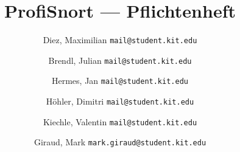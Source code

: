 \documentclass[a4paper]{scrreprt}
\begin{document}
\title{ProfiSnort --- Pflichtenheft}
\author{
    Diez, Maximilian
    \texttt{mail@student.kit.edu}
    \and
    Brendl, Julian
    \texttt{mail@student.kit.edu}
    \and
    Hermes, Jan
    \texttt{mail@student.kit.edu}
    \and
    Höhler, Dimitri
    \texttt{mail@student.kit.edu}
    \and
    Kiechle, Valentin
    \texttt{mail@student.kit.edu}
    \and
    Giraud, Mark
    \texttt{mark.giraud@student.kit.edu}
}
\maketitle



\newpage
\tableofcontents
\newpage



















\appendix

\end{document}
